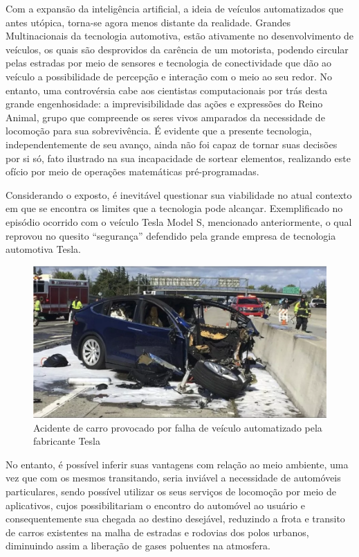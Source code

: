 \documentclass[a4paper, 12pt]{article}
\begin{document}
    Com a expansão da inteligência artificial, a ideia de veículos automatizados que antes utópica, torna-se agora menos distante da realidade. Grandes Multinacionais da tecnologia automotiva, estão ativamente no desenvolvimento de veículos, os quais são desprovidos da carência de um motorista, podendo circular pelas estradas por meio de sensores e tecnologia de conectividade que dão ao veículo a possibilidade de percepção e interação com o meio ao seu redor. No entanto, uma controvérsia cabe aos cientistas computacionais por trás desta grande engenhosidade: a imprevisibilidade das ações e expressões do Reino Animal, grupo que compreende os seres vivos amparados da necessidade de locomoção para sua sobrevivência. É evidente que a presente tecnologia, independentemente de seu avanço, ainda não foi capaz de tornar suas decisões por si só, fato ilustrado na sua incapacidade de sortear elementos, realizando este ofício por meio de operações matemáticas pré-programadas.

    Considerando o exposto, é inevitável questionar sua viabilidade no atual contexto em que se encontra os limites que a tecnologia pode alcançar. Exemplificado no episódio ocorrido com o veículo Tesla Model S, mencionado anteriormente, o qual reprovou no quesito “segurança” defendido pela grande empresa de tecnologia automotiva Tesla.

    \begin{figure}[htb]
        \centering
        \includegraphics[scale=0.5]{0005.png}
        \caption{Acidente de carro provocado por falha de veículo automatizado pela fabricante Tesla}
        \label{fig:my_label}
    \end{figure}
    
    
    No entanto, é possível inferir suas vantagens com relação ao meio ambiente, uma vez que com os mesmos transitando, seria inviável a necessidade de automóveis particulares, sendo possível utilizar os seus serviços de locomoção por meio de aplicativos, cujos possibilitariam o encontro do automóvel ao usuário e consequentemente sua chegada ao destino desejável, reduzindo a frota e transito de carros existentes na malha de estradas e rodovias dos polos urbanos, diminuindo assim a liberação de gases poluentes na atmosfera.
\end{document}
